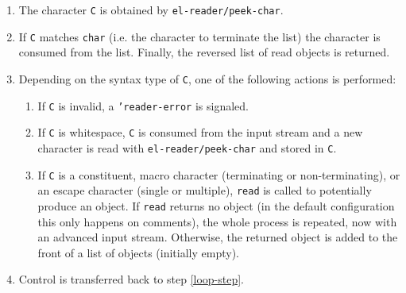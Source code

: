 \documentclass[a4paper,10pt,twoside]{report}
\newcommand{\sym}[1]{\texttt{#1}}
\newcommand{\fun}[1]{\texttt{#1}}
\newcommand{\Read}{\fun{read}}
\begin{document}
\begin{enumerate}
\item The character \sym{C} is obtained by \fun{el-reader/peek-char}.
\item \label{loop-step}
  If \sym{C} matches \sym{char} (i.e. the character to terminate the list)
  the character is consumed from the list.  Finally, the reversed list of read
  objects is returned.
\item Depending on the syntax type of \sym{C}, one of the following actions is
  performed:
  \begin{enumerate}
  \item If \sym{C} is invalid, a \sym{'reader-error} is signaled.
  \item If \sym{C} is whitespace, \sym{C} is consumed from the input stream and
    a new character is read with \fun{el-reader/peek-char} and stored in
    \sym{C}.
  \item If \sym{C} is a constituent, macro character (terminating or
    non-terminating), or an escape character (single or multiple), \Read{} is
    called to potentially produce an object.  If \Read{} returns no object (in
    the default configuration this only happens on comments), the whole process
    is repeated, now with an advanced input stream.  Otherwise, the returned
    object is added to the front of a list of objects (initially empty).
  \end{enumerate}
\item Control is transferred back to step \ref{loop-step}.
\end{enumerate}
\end{document}
